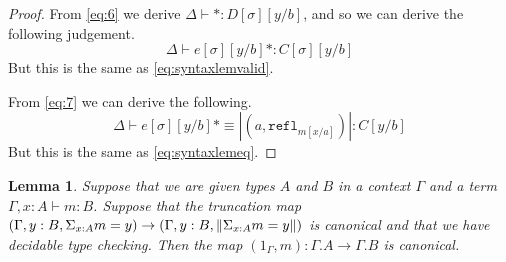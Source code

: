 \documentclass[a4paper]{amsart}
\newtheorem{lemma}[theorem]{Lemma}
\theoremstyle{definition}
\newcommand{\refl}{\mathtt{refl}}
\begin{document}
\begin{proof}
  From \eqref{eq:6} we derive $\Delta \vdash \ast : D[\sigma][y/b]$,
  and so we can derive the following judgement.
  \begin{equation*}
    \Delta \vdash e[\sigma][y/b]\ast : C[\sigma][y/b]
  \end{equation*}
  But this is the same as \eqref{eq:syntaxlemvalid}.

  From \eqref{eq:7} we can derive the following.
  \begin{equation*}
    \Delta \vdash e[\sigma][y/b]\ast \equiv |(a, \refl_{m[x/a]})| : C[y/b]
  \end{equation*}
  But this is the same as \eqref{eq:syntaxlemeq}.
\end{proof}

\begin{lemma}
  \label{lem:trunccanontocanon}
  Suppose that we are given types $A$ and $B$ in a context $\Gamma$
  and a term $\Gamma, x : A \vdash m : B$. Suppose that the truncation
  map $(\Gamma, y : B, \Sigma_{x : A} m = y) \to (\Gamma, y : B, \|
  \Sigma_{x : A} m = y \|)$ is canonical and that we have decidable type
  checking. Then the map $(1_\Gamma, m) \colon \Gamma.A \to \Gamma.B$
  is canonical.
\end{lemma}
\end{document}
